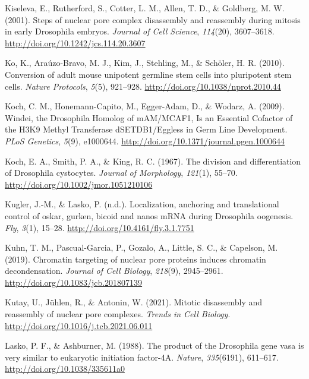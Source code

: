 \documentclass[12pt,oneside]{reedthesis}
\begin{document}
\leavevmode\hypertarget{ref-kiselevaStepsNuclearPore2001}{}%
Kiseleva, E., Rutherford, S., Cotter, L. M., Allen, T. D., \& Goldberg, M. W. (2001). Steps of nuclear pore complex disassembly and reassembly during mitosis in early Drosophila embryos. \emph{Journal of Cell Science}, \emph{114}(20), 3607--3618. \url{http://doi.org/10.1242/jcs.114.20.3607}

\leavevmode\hypertarget{ref-koConversionAdultMouse2010}{}%
Ko, K., Araúzo-Bravo, M. J., Kim, J., Stehling, M., \& Schöler, H. R. (2010). Conversion of adult mouse unipotent germline stem cells into pluripotent stem cells. \emph{Nature Protocols}, \emph{5}(5), 921--928. \url{http://doi.org/10.1038/nprot.2010.44}

\leavevmode\hypertarget{ref-kochWindeiDrosophilaHomolog2009}{}%
Koch, C. M., Honemann-Capito, M., Egger-Adam, D., \& Wodarz, A. (2009). Windei, the Drosophila Homolog of mAM/MCAF1, Is an Essential Cofactor of the H3K9 Methyl Transferase dSETDB1/Eggless in Germ Line Development. \emph{PLoS Genetics}, \emph{5}(9), e1000644. \url{http://doi.org/10.1371/journal.pgen.1000644}

\leavevmode\hypertarget{ref-kochDivisionDifferentiationDrosophila1967}{}%
Koch, E. A., Smith, P. A., \& King, R. C. (1967). The division and differentiation of Drosophila cystocytes. \emph{Journal of Morphology}, \emph{121}(1), 55--70. \url{http://doi.org/10.1002/jmor.1051210106}

\leavevmode\hypertarget{ref-kuglerLocalizationAnchoringTranslational2009}{}%
Kugler, J.-M., \& Lasko, P. (n.d.). Localization, anchoring and translational control of oskar, gurken, bicoid and nanos mRNA during Drosophila oogenesis. \emph{Fly}, \emph{3}(1), 15--28. \url{http://doi.org/10.4161/fly.3.1.7751}

\leavevmode\hypertarget{ref-kuhnChromatinTargetingNuclear2019}{}%
Kuhn, T. M., Pascual-Garcia, P., Gozalo, A., Little, S. C., \& Capelson, M. (2019). Chromatin targeting of nuclear pore proteins induces chromatin decondensation. \emph{Journal of Cell Biology}, \emph{218}(9), 2945--2961. \url{http://doi.org/10.1083/jcb.201807139}

\leavevmode\hypertarget{ref-kutayMitoticDisassemblyReassembly2021}{}%
Kutay, U., Jühlen, R., \& Antonin, W. (2021). Mitotic disassembly and reassembly of nuclear pore complexes. \emph{Trends in Cell Biology}. \url{http://doi.org/10.1016/j.tcb.2021.06.011}

\leavevmode\hypertarget{ref-laskoProductDrosophilaGene1988}{}%
Lasko, P. F., \& Ashburner, M. (1988). The product of the Drosophila gene vasa is very similar to eukaryotic initiation factor-4A. \emph{Nature}, \emph{335}(6191), 611--617. \url{http://doi.org/10.1038/335611a0}
\end{document}
